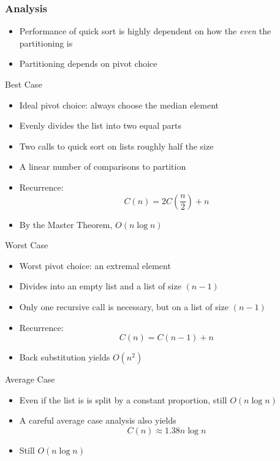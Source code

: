 \subsubsection{Analysis}

\begin{itemize}
  \item Performance of quick sort is highly dependent on how the \emph{even} the partitioning is
  \item Partitioning depends on pivot choice
\end{itemize}

Best Case
\begin{itemize}
  \item Ideal pivot choice: always choose the median element
  \item Evenly divides the list into two equal parts
  \item Two calls to quick sort on lists roughly half the size
  \item A linear number of comparisons to partition
  \item Recurrence:
	$$C(n) = 2C\left(\frac{n}{2}\right) + n$$
  \item By the Master Theorem, $O(n\log{n})$
\end{itemize}

Worst Case
\begin{itemize}
  \item Worst pivot choice: an extremal element
  \item Divides into an empty list and a list of size $(n-1)$
  \item Only one recursive call is necessary, but on a list of size $(n-1)$
  \item Recurrence:
	$$C(n) = C(n-1) + n$$
  \item Back substitution yields $O(n^2)$
\end{itemize}

Average Case
\begin{itemize}
  \item Even if the list is is split by a constant proportion, still $O(n\log{n})$
  \item A careful average case analysis also yields
	$$C(n) \approx 1.38n\log{n}$$
  \item Still $O(n\log{n})$
\end{itemize}


